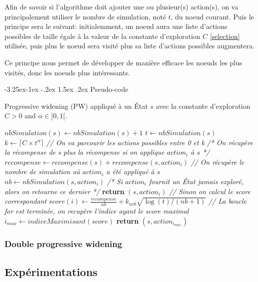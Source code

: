 \documentclass[pdftex,french, english]{article}	%
\makeatletter
\newcounter {subsubsubsection}[subsubsection]
\newcommand\subsubsubsection{\@startsection{subsubsubsection}{4}{\z@}%
                                     {-3.25ex\@plus -1ex \@minus -.2ex}%
                                     {1.5ex \@plus .2ex}%
                                     {\normalfont\normalsize\bfseries}}
\makeatother
\begin{document}
		Afin de savoir si l'algorithme doit ajouter une ou plusieur(s) action(s), on va principalement utiliser le nombre de simulation, noté $t$, du noeud courant.
		Puis le principe sera le suivant: initialemment, un noeud aura une liste d'actions possibles de taille égale à la valeur de la constante d'exploration $C$ \ref{selection} utilisée, puis plus le noeud sera visité plus sa liste d'actions possibles augmentera.

		Ce principe nous permet de développer de manière efficace les noeuds les plus visités, donc les noeuds plus intéressants.

		\subsubsubsection{Pseudo-code}

		\begin{algorithm}[H]
			\caption{Progressive widening (PW) appliqué à un État $s$ avec la constante d'exploration $C > 0$ and $\alpha \in ]0, 1[$.}
			\label{alg:spw}
				\begin{algorithmic}[1]
						\State $nbSimulation(s) \gets nbSimulation(s) + 1$ 
						\State $t \gets nbSimulation(s)$
						\State $k \gets \lceil{C \times t^{\alpha}}\rceil$
						\State \textit{// On va parcourir les actions possibles entre 0 et k}
							\State \textit{/* On récupère la récompense de s plus la récompense si on applique $action_{i}$ à $s$ */}
							\State $recompense \gets recompense(s) + recompense(s, action_{i})$
							\State \textit{// On récupère le nombre de simulation où $action_{i}$ a été appliqué à $s$}
							\State $nb \gets nbSimulation(s, action_{i})$
								\State \textit{/* Si $action_{i}$ fournit un État jamais exploré, alors on retourne ce dernier */}
								\State \textbf{return} $(s, action_{i})$
							\Else
								\State \textit{// Sinon on calcul le score correspondant}
								\State $score(i) \gets \frac{recompense}{nb} + \textbf{$k_{ucb}$}\sqrt{\log(t)/(nb + 1)}$							
							\EndIf
						\EndFor
						\State \textit{// La boucle for est terminée, on recupère l'indice ayant le score maximal}
						\State $i_{max} \gets indiceMaximisant(score)$
						\State \textbf{return} $(s, action_{i_{max}})$
					\EndFunction
				\end{algorithmic}
		\end{algorithm}
	\subsubsection{Double progressive widening}
\subsection{Expérimentations}
\end{document}
